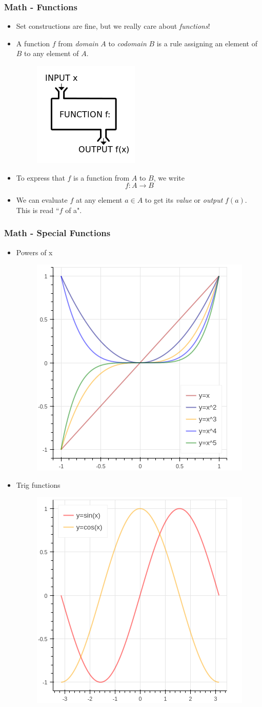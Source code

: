\documentclass{beamer}
\begin{document}
\frame
{
\frametitle{Math - Functions}
\begin{itemize}[<+->]
\item Set constructions are fine, but we really care about \emph{functions}!
\item A function $f$ from \emph{domain} $A$ to \emph{codomain} $B$ is a rule assigning an element of $B$ to any element of $A$.
\begin{figure}
  \includegraphics[width=.2\textwidth]{function.png}
\end{figure}
\item To express that $f$ is a function from $A$ to $B$, we write 
\[ f:A \to B\]
\item We can evaluate $f$ at any element $a \in A$ to get its \emph{value} or \emph{output} $f(a)$. This is read ``$f$ of a".

\end{itemize}
}

\frame
{
\frametitle{Math - Special Functions}
\begin{itemize}[<+->]
\item Powers of x 
\begin{figure}
  \includegraphics[width=.3\textwidth]{powers.png}
\end{figure}
\item Trig functions 
\begin{figure}
  \includegraphics[width=.3\textwidth]{trig.png}
\end{figure}
\end{itemize}
}
\end{document}
